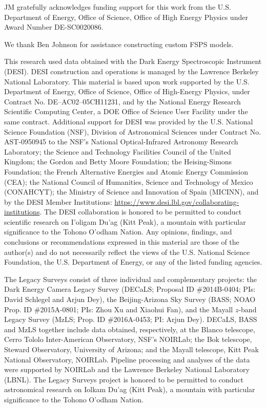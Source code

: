 \documentclass[modern,linenumbers]{aastex701}
\begin{document}
\begin{acknowledgements}
JM gratefully acknowledges funding support for this work from the
U.S. Department of Energy, Office of Science, Office of High Energy
Physics under Award Number DE-SC0020086.

We thank Ben Johnson for assistance constructing custom FSPS models.

This research used data obtained with the Dark Energy Spectroscopic
Instrument (DESI). DESI construction and operations is managed by the
Lawrence Berkeley National Laboratory. This material is based upon
work supported by the U.S. Department of Energy, Office of Science,
Office of High-Energy Physics, under Contract No. DE–AC02–05CH11231,
and by the National Energy Research Scientific Computing Center, a DOE
Office of Science User Facility under the same contract. Additional
support for DESI was provided by the U.S. National Science Foundation
(NSF), Division of Astronomical Sciences under Contract
No. AST-0950945 to the NSF’s National Optical-Infrared Astronomy
Research Laboratory; the Science and Technology Facilities Council of
the United Kingdom; the Gordon and Betty Moore Foundation; the
Heising-Simons Foundation; the French Alternative Energies and Atomic
Energy Commission (CEA); the National Council of Humanities, Science
and Technology of Mexico (CONAHCYT); the Ministry of Science and
Innovation of Spain (MICINN), and by the DESI Member Institutions:
\url{https://www.desi.lbl.gov/collaborating-institutions}. The DESI
collaboration is honored to be permitted to conduct scientific
research on I’oligam Du’ag (Kitt Peak), a mountain with particular
significance to the Tohono O’odham Nation. Any opinions, findings, and
conclusions or recommendations expressed in this material are those of
the author(s) and do not necessarily reflect the views of the
U.S. National Science Foundation, the U.S. Department of Energy, or
any of the listed funding agencies.

The Legacy Surveys consist of three individual and complementary
projects: the Dark Energy Camera Legacy Survey (DECaLS; Proposal ID
\#2014B-0404; PIs: David Schlegel and Arjun Dey), the Beijing-Arizona
Sky Survey (BASS; NOAO Prop. ID \#2015A-0801; PIs: Zhou Xu and Xiaohui
Fan), and the Mayall $z$-band Legacy Survey (MzLS; Prop. ID
\#2016A-0453; PI: Arjun Dey). DECaLS, BASS and MzLS together include
data obtained, respectively, at the Blanco telescope, Cerro Tololo
Inter-American Observatory, NSF’s NOIRLab; the Bok telescope, Steward
Observatory, University of Arizona; and the Mayall telescope, Kitt
Peak National Observatory, NOIRLab. Pipeline processing and analyses
of the data were supported by NOIRLab and the Lawrence Berkeley
National Laboratory (LBNL). The Legacy Surveys project is honored to
be permitted to conduct astronomical research on Iolkam Du’ag (Kitt
Peak), a mountain with particular significance to the Tohono O’odham
Nation.


\end{acknowledgements}
\end{document}
